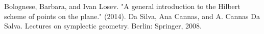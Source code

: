 
\begin{thebibliography}{10}
  Bolognese, Barbara, and Ivan Losev. "A general introduction to the Hilbert scheme of points on the plane." (2014).
 Da Silva, Ana Cannas, and A. Cannas Da Salva. Lectures on symplectic geometry. Berlin: Springer, 2008.
\end{thebibliography}
